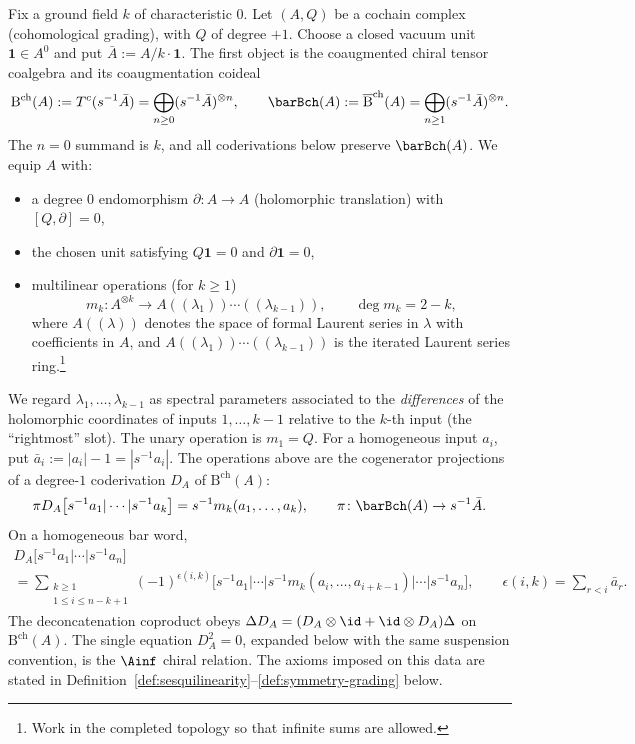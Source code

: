 \begin{definition}
\label{def:ainfty_chiral}
Fix a ground field $k$ of characteristic $0$. Let $(A,Q)$ be a cochain complex (cohomological grading), with $Q$ of degree $+1$.
Choose a closed vacuum unit $\mathbf 1\in A^0$ and put
$\bar A:=A/k\cdot\mathbf 1$. The first object is the coaugmented
chiral tensor coalgebra and its coaugmentation coideal
\[
\mathrm B^{\mathrm{ch}}(A):=T^c(s^{-1}\bar A)
=\bigoplus_{n\ge0}(s^{-1}\bar A)^{\otimes n},
\qquad
\barBch(A):=\overline{\mathrm B}^{\mathrm{ch}}(A)
=\bigoplus_{n\ge1}(s^{-1}\bar A)^{\otimes n}.
\]
The $n=0$ summand is $k$, and all coderivations below preserve
$\barBch(A)$. We equip $A$ with:
\begin{itemize}
 \item a degree $0$ endomorphism $\partial\colon A\to A$ (holomorphic translation) with $[Q,\partial]=0$,
 \item the chosen unit satisfying $Q\mathbf 1=0$ and $\partial \mathbf 1=0$,
 \item multilinear operations (for $k\ge 1$)
 \begin{equation}
 \label{eq:mk-type}
 m_k \colon A^{\otimes k}\longrightarrow A((\lambda_1))\cdots((\lambda_{k-1})),
 \qquad \deg m_k = 2-k,
 \end{equation}
 where $A((\lambda))$ denotes the space of formal Laurent series in $\lambda$ with coefficients in $A$, and $A((\lambda_1))\cdots((\lambda_{k-1}))$ is the iterated Laurent series ring.\footnote{Work in the completed topology so that infinite sums are allowed.}
\end{itemize}
We regard $\lambda_1,\dots,\lambda_{k-1}$ as spectral parameters associated to the \emph{differences} of the holomorphic coordinates of inputs $1,\dots,k-1$ relative to the $k$-th input (the ``rightmost'' slot).
The unary operation is $m_1=Q$. For a homogeneous input $a_i$, put
$\bar a_i:=|a_i|-1=|s^{-1}a_i|$. The operations above are the
cogenerator projections of a degree-$1$ coderivation $D_A$ of
$\mathrm B^{\mathrm{ch}}(A)$:
\[
\pi D_A\bigl[s^{-1}a_1|\cdots|s^{-1}a_k\bigr]
=s^{-1}m_k(a_1,\ldots,a_k),
\qquad
\pi\colon\barBch(A)\to s^{-1}\bar A .
\]
On a homogeneous bar word,
\begin{multline}
\label{eq:axioms-ainfty-coderivation}
D_A\bigl[s^{-1}a_1|\cdots|s^{-1}a_n\bigr] \\
=
\sum_{\substack{k\ge1\\1\le i\le n-k+1}}
(-1)^{\epsilon(i,k)}
\bigl[s^{-1}a_1|\cdots|
s^{-1}m_k(a_i,\ldots,a_{i+k-1})|\cdots|s^{-1}a_n\bigr],
\qquad
\epsilon(i,k)=\sum_{r<i}\bar a_r .
\end{multline}
The deconcatenation coproduct obeys
$\Delta D_A=(D_A\otimes\id+\id\otimes D_A)\Delta$ on
$\mathrm B^{\mathrm{ch}}(A)$. The single equation
$D_A^2=0$, expanded below with the same suspension convention, is
the $\Ainf$ chiral relation.
The axioms imposed on this data are stated in Definition~\ref{def:sesquilinearity}--\ref{def:symmetry-grading} below.
\end{definition}


